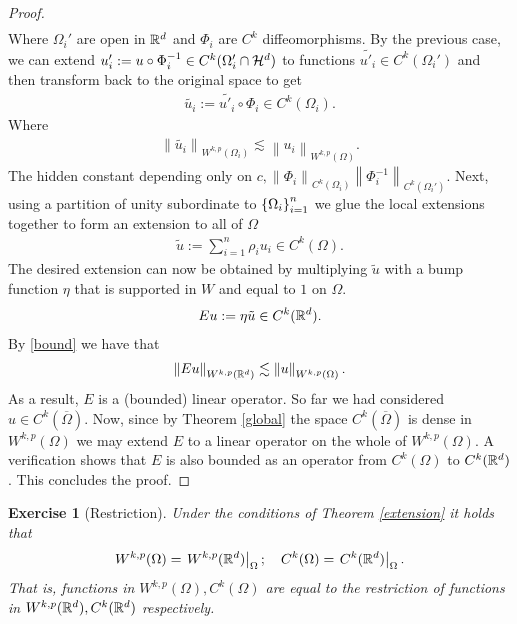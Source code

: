 \documentclass[12pt]{article}
\newtheorem{exercise}{Exercise}
\theoremstyle{remark}
\renewcommand{\norm}[1]{\left\lVert #1 \right\rVert}\renewcommand{\abs}[1]{\left| #1 \right|}
\newcommand\restr[2]{\left.#1\right|_{#2}}
\begin{document}
\begin{proof}
\begin{align*}
	\end{align*}
	Where $\Omega_i'$ are open in  $\mathbb{R}^{d}$ and $\Phi_i$ are $C^k$ diffeomorphisms. By the previous case, we can extend  $u'_i:=u \circ \Phi_i^{-1} \in C^k (\Omega_i' \cap \mathcal{H}^d)$ to functions $\widetilde{u'_i} \in C^k(\Omega_i')$ and then transform back to the original space to get
	\begin{align*}
		\tilde{u_i}:= \widetilde{u'_i} \circ \Phi_i \in C^k(\Omega_i).
	\end{align*}
	Where
	\begin{align}\label{bound}
		\norm{\tilde{u_i}}_{W^{k,p}(\Omega_i)}\lesssim  \norm{u_i}_{W^{k,p}(\Omega)}.
	\end{align}
	The hidden constant depending only on  $c,\norm{\Phi_i}_{C^k(\Omega_i)}\norm{\Phi_i^{-1}}_{C^k(\Omega_i')}$. Next, using a partition of unity subordinate to $\left\{\Omega_i\right\}_{i=1}^n $ we glue the local extensions together to form an extension to all of $\Omega$
	\begin{align*}
		\tilde{u}:= \sum_{i=1}^n \rho _i{u_i} \in C^k(\Omega).
	\end{align*}
	The desired extension can now be obtained by multiplying $\tilde{u}$ with a bump function $\eta$ that is supported in $W$ and equal to  $1$ on  $\Omega$.
	\begin{align*}
		Eu := \eta \tilde{u} \in C^k(\mathbb{R}^d).
	\end{align*}
	By \eqref{bound} we have that
	\begin{align*}
		\norm{E u}_{W^{k,p}(\R^d)} \lesssim  \norm{u}_{W^{k,p}(\Omega)}.
	\end{align*}
	As a result, $E$ is a (bounded) linear operator. So far we had considered $u \in  C^k(\overline{\Omega})$. Now, since by Theorem \ref{global} the space  $C^k(\overline{\Omega})$ is dense in $W^{k,p}(\Omega)$ we may extend  $E$ to a linear operator on the whole of $W^{k,p}(\Omega)$. A verification shows that $E$ is also bounded as an operator from  $C^k(\Omega)$ to  $C^k(\mathbb{R}^d)$. This concludes the proof.
\end{proof}
\begin{exercise}[Restriction]\label{restriction} Under the conditions of Theorem \ref{extension} it holds that
	\begin{align*}
		W^{k,p}(\Omega)= \restr{W^{k,p}(\R^d)}{\Omega}; \quad C^{k}(\Omega)= \restr{C^{k}(\R^d)}{\Omega}.
	\end{align*}
	That is, functions in $W^{k,p}(\Omega),C^{k}(\Omega)$ are equal to the restriction of functions in $W^{k,p}(\mathbb{R}^d),C^{k}(\mathbb{R}^d)$ respectively.
\end{exercise}
\end{document}
